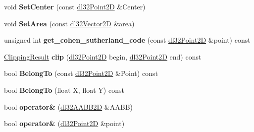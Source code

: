 \begin{DoxyCompactItemize}
\item 
\hypertarget{classdl32_a_a_b_b2_d_ad1be1b4e1dcd7277fcffe1a2d14d647c}{void {\bfseries Set\-Center} (const \hyperlink{structdl32_point2_d}{dl32\-Point2\-D} \&Center)}\label{classdl32_a_a_b_b2_d_ad1be1b4e1dcd7277fcffe1a2d14d647c}

\item 
\hypertarget{classdl32_a_a_b_b2_d_aaa058d19e90fda84aa3f015e95c2d754}{void {\bfseries Set\-Area} (const \hyperlink{structdl32_vector2_d}{dl32\-Vector2\-D} \&area)}\label{classdl32_a_a_b_b2_d_aaa058d19e90fda84aa3f015e95c2d754}

\item 
\hypertarget{classdl32_a_a_b_b2_d_a1ba7780dd3b382fab843869b30bde9df}{unsigned int {\bfseries get\-\_\-cohen\-\_\-sutherland\-\_\-code} (const \hyperlink{structdl32_point2_d}{dl32\-Point2\-D} \&point) const }\label{classdl32_a_a_b_b2_d_a1ba7780dd3b382fab843869b30bde9df}

\item 
\hypertarget{classdl32_a_a_b_b2_d_a0e055157547a5bd808841bc40900b140}{\hyperlink{structdl32_a_a_b_b2_d_1_1_clipping_result}{Clipping\-Result} {\bfseries clip} (\hyperlink{structdl32_point2_d}{dl32\-Point2\-D} begin, \hyperlink{structdl32_point2_d}{dl32\-Point2\-D} end) const }\label{classdl32_a_a_b_b2_d_a0e055157547a5bd808841bc40900b140}

\item 
\hypertarget{classdl32_a_a_b_b2_d_a3e4991e5c5cbb34ea84ea872675192c0}{bool {\bfseries Belong\-To} (const \hyperlink{structdl32_point2_d}{dl32\-Point2\-D} \&Point) const }\label{classdl32_a_a_b_b2_d_a3e4991e5c5cbb34ea84ea872675192c0}

\item 
\hypertarget{classdl32_a_a_b_b2_d_ab13059b7a85f8c09d457f313e9f6dd56}{bool {\bfseries Belong\-To} (float X, float Y) const }\label{classdl32_a_a_b_b2_d_ab13059b7a85f8c09d457f313e9f6dd56}

\item 
\hypertarget{classdl32_a_a_b_b2_d_abdf4baabb9f0ea983e15a42509a31e7b}{bool {\bfseries operator\&} (\hyperlink{classdl32_a_a_b_b2_d}{dl32\-A\-A\-B\-B2\-D} \&A\-A\-B\-B)}\label{classdl32_a_a_b_b2_d_abdf4baabb9f0ea983e15a42509a31e7b}

\item 
\hypertarget{classdl32_a_a_b_b2_d_ac2ba0bd460c4206590514ecb489107f2}{bool {\bfseries operator\&} (\hyperlink{structdl32_point2_d}{dl32\-Point2\-D} \&point)}\label{classdl32_a_a_b_b2_d_ac2ba0bd460c4206590514ecb489107f2}


\end{DoxyCompactItemize}
